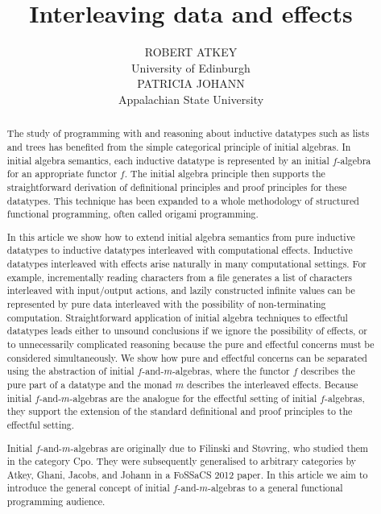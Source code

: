 \documentclass{jfp1}
\title{Interleaving data and effects}
\author[R. Atkey, P. Johann]
       {ROBERT ATKEY \\
         University of Edinburgh \\
         \vspace{1em}
         PATRICIA JOHANN \\
         Appalachian State University \\
         \email{bob.atkey@ed.ac.uk, johannp@appstate.edu}}
\begin{document}
\label{firstpage}

\maketitle

\begin{abstract}
  The study of programming with and reasoning about inductive
  datatypes such as lists and trees has benefited from the simple
  categorical principle of initial algebras. In initial algebra
  semantics, each inductive datatype is represented by an initial
  $f$-algebra for an appropriate functor $f$. The initial algebra
  principle then supports the straightforward derivation of
  definitional principles and proof principles for these datatypes.
  This technique has been expanded to a whole methodology of
  structured functional programming, often called origami programming.

  In this article we show how to extend initial algebra semantics
  from pure inductive datatypes to inductive datatypes interleaved
  with computational effects. Inductive datatypes interleaved with
  effects arise naturally in many computational settings. For example,
  incrementally reading characters from a file generates a list of
  characters interleaved with input/output actions, and lazily
  constructed infinite values can be represented by pure data
  interleaved with the possibility of non-terminating
  computation. Straightforward application of initial algebra
  techniques to effectful datatypes leads either to unsound
  conclusions if we ignore the possibility of effects, or to
  unnecessarily complicated reasoning because the pure and effectful
  concerns must be considered simultaneously. We show how pure and
  effectful concerns can be separated using the abstraction of initial
  $f$-and-$m$-algebras, where the functor $f$ describes the pure part
  of a datatype and the monad $m$ describes the interleaved
  effects. Because initial $f$-and-$m$-algebras are the analogue for
  the effectful setting of initial $f$-algebras, they support the
  extension of the standard definitional and proof principles to the
  effectful setting.

  Initial $f$-and-$m$-algebras are originally due to Filinski and
  St\o{}vring, who studied them in the category Cpo. They were
  subsequently generalised to arbitrary categories by Atkey, Ghani,
  Jacobs, and Johann in a FoSSaCS 2012 paper. In this article we aim
  to introduce the general concept of initial $f$-and-$m$-algebras to
  a general functional programming audience.
\end{abstract}
\end{document}
